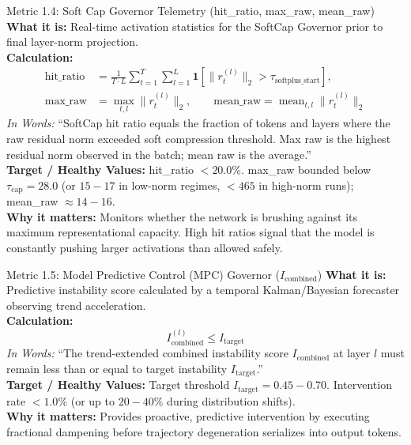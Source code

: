 \documentclass[11pt,a4paper]{article}
\begin{document}
\begin{metricbox}{Metric 1.4: Soft Cap Governor Telemetry (hit\_ratio, max\_raw, mean\_raw)}
\textbf{What it is:} Real-time activation statistics for the SoftCap Governor prior to final layer-norm projection.\\
\textbf{Calculation:}
 $$\begin{aligned}
\text{hit\_ratio} &= \frac{1}{T \cdot L} \sum_{t=1}^T \sum_{l=1}^L \mathbf{1}\left[\|r^{(l)}_t\|_2 > \tau_{\text{softplus\_start}}\right],\\
\text{max\_raw} &= \max_{t,l} \|r^{(l)}_t\|_2, \qquad \text{mean\_raw} = \operatorname{mean}_{t,l} \|r^{(l)}_t\|_2
\end{aligned}$$ \emph{In Words:} ``SoftCap hit ratio equals the fraction of tokens and layers where the raw residual norm exceeded soft compression threshold. Max raw is the highest residual norm observed in the batch; mean raw is the average.''\\
\textbf{Target / Healthy Values:} hit\_ratio $< 20.0\%$. max\_raw bounded below $\tau_{\text{cap}} = 28.0$ (or $15 - 17$ in low-norm regimes, $< 465$ in high-norm runs); mean\_raw $\approx 14 - 16$.\\
\textbf{Why it matters:} Monitors whether the network is brushing against its maximum representational capacity. High hit ratios signal that the model is constantly pushing larger activations than allowed safely.
\end{metricbox}

\begin{metricbox}{Metric 1.5: Model Predictive Control (MPC) Governor ($I_{\text{combined}}$)}
\textbf{What it is:} Predictive instability score calculated by a temporal Kalman/Bayesian forecaster observing trend acceleration.\\
\textbf{Calculation:}
 $$I_{\text{combined}}^{(l)} \le I_{\text{target}}$$ \emph{In Words:} ``The trend-extended combined instability score $I_{\text{combined}}$ at layer $l$ must remain less than or equal to target instability $I_{\text{target}}$.''\\
\textbf{Target / Healthy Values:} Target threshold $I_{\text{target}} = 0.45 - 0.70$. Intervention rate $< 1.0\%$ (or up to $20-40\%$ during distribution shifts).\\
\textbf{Why it matters:} Provides proactive, predictive intervention by executing fractional dampening before trajectory degeneration serializes into output tokens.
\end{metricbox}
\end{document}

